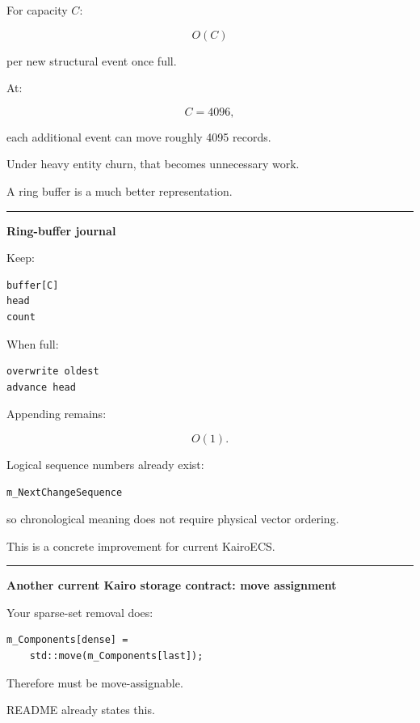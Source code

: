 For capacity \(C\):

\[
O(C)
\]

per new structural event once full.

At:

\[
C=4096,
\]

each additional event can move roughly 4095 records.

Under heavy entity churn, that becomes unnecessary work.

A ring buffer is a much better representation.

\begin{center}\rule{0.5\linewidth}{0.5pt}\end{center}

\textbf{Ring-buffer journal}

Keep:

\begin{verbatim}
buffer[C]
head
count
\end{verbatim}

When full:

\begin{verbatim}
overwrite oldest
advance head
\end{verbatim}

Appending remains:

\[
O(1).
\]

Logical sequence numbers already exist:

\begin{verbatim}
m_NextChangeSequence
\end{verbatim}

so chronological meaning does not require physical vector ordering.

This is a concrete improvement for current KairoECS.

\begin{center}\rule{0.5\linewidth}{0.5pt}\end{center}

\textbf{Another current Kairo storage contract: move assignment}

Your sparse-set removal does:

\begin{verbatim}
m_Components[dense] =
    std::move(m_Components[last]);
\end{verbatim}

Therefore  must be move-assignable.

README already states this.

